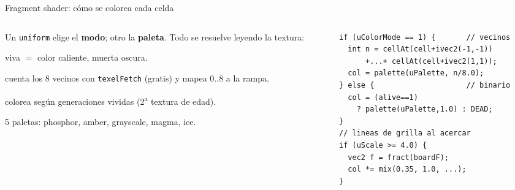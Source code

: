\documentclass[aspectratio=169]{beamer}
\begin{document}
\begin{frame}[fragile]{Fragment shader: cómo se colorea cada celda}
    \begin{columns}[T]
        \begin{column}{0.52\textwidth}
            \footnotesize
            Un \texttt{uniform} elige el \textbf{modo}; otro la \textbf{paleta}.
            Todo se resuelve leyendo la textura:
            \begin{description}\footnotesize
                \item[Binario] viva $=$ color caliente, muerta oscura.
                \item[Vecinos] cuenta los 8 vecinos con \texttt{texelFetch}
                      (gratis) y mapea $0..8$ a la rampa.
                \item[Edad] colorea según generaciones vividas (2\textsuperscript{a}
                      textura de edad).
            \end{description}
            5 paletas: phosphor, amber, grayscale, magma, ice.
        \end{column}
        \begin{column}{0.48\textwidth}
\begin{lstlisting}
if (uColorMode == 1) {       // vecinos
  int n = cellAt(cell+ivec2(-1,-1))
      +...+ cellAt(cell+ivec2(1,1));
  col = palette(uPalette, n/8.0);
} else {                     // binario
  col = (alive==1)
    ? palette(uPalette,1.0) : DEAD;
}
// lineas de grilla al acercar
if (uScale >= 4.0) {
  vec2 f = fract(boardF);
  col *= mix(0.35, 1.0, ...);
}
\end{lstlisting}
        \end{column}
    \end{columns}
\end{frame}
\end{document}
